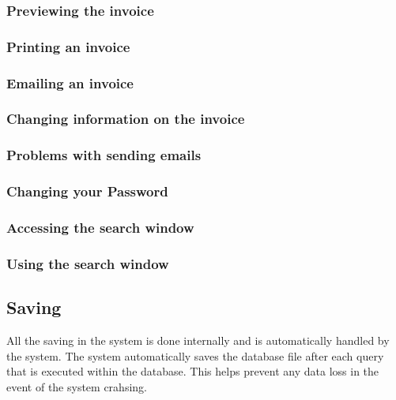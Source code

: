 \pagebreak
\subsubsection{Previewing the invoice}
\label{fig:Previewing the invoice}


\pagebreak
\subsubsection{Printing an invoice}
\label{fig:Printing an invoice}


\pagebreak
\subsubsection{Emailing an invoice}
\label{fig:Emailing an invoice}


\pagebreak
\subsubsection{Changing information on the invoice}
\label{fig:Changing information on the invoice}


\pagebreak
\subsubsection{Problems with sending emails}
\label{fig:Problems with sending emails}


\pagebreak
\subsubsection{Changing your Password}
\label{fig:Changing your Password}


\pagebreak
\subsubsection{Accessing the search window}
\label{fig:Accessing the search window}

\pagebreak
\subsubsection{Using the search window}
\label{fig:Using the search window}




\subsection{Saving}

All the saving in the system is done internally and is automatically handled by the system. The system automatically saves the database file after each query that is executed within the database. This helps prevent any data loss in the event of the system crahsing.

